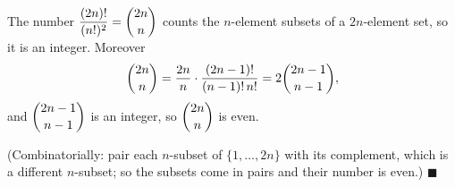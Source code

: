 The number $\dfrac{(2n)!}{(n!)^2}=\dbinom{2n}{n}$ counts the $n$-element subsets of a $2n$-element set, so it is an integer. Moreover
\[
\dbinom{2n}{n}=\dfrac{2n}{n}\cdot\dfrac{(2n-1)!}{(n-1)!\,n!}=2\dbinom{2n-1}{n-1},
\]
and $\dbinom{2n-1}{n-1}$ is an integer, so $\dbinom{2n}{n}$ is even.

(Combinatorially: pair each $n$-subset of $\{1,\dots,2n\}$ with its complement, which is a different $n$-subset; so the subsets come in pairs and their number is even.) $\blacksquare$
